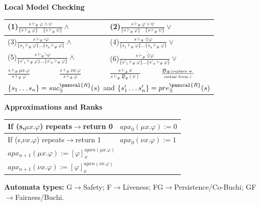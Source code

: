 \documentclass{article}
\newcommand{\Rb}{\pazocal{R}}
\newcommand{\Db}{\mathfrak{D}}
\begin{document}
\begin{multicols}{4}
\textbf{Local Model Checking}
\begin{tabular}{|l|l|l|l|}
\hline
\multicolumn{2}{|l|}{\tiny(1)\small$\frac{s \vdash_{\Phi} \varphi \wedge \psi}{\{s \vdash_{\Phi} \varphi \} \quad \{s \vdash_{\Phi} \psi\}} \wedge$} & \multicolumn{2}{|l|}{\tiny(2)\small$\frac{s \vdash_{\Phi} \varphi \vee \psi}{\{s \vdash_{\Phi} \varphi \} \quad \{s \vdash_{\Phi} \psi\}} \vee $}\\ \hline
\multicolumn{2}{|l|}{\tiny(3)\small$\frac{s \vdash_{\Phi} \square \varphi}{\{s_1 \vdash_{\Phi} \varphi\} \dots \{s_n \vdash_{\Phi} \varphi\}} \wedge$}&\multicolumn{2}{|l|}{\tiny(4)\small$\frac{s \vdash_{\Phi} \diamondsuit \varphi}{\{s_1 \vdash_{\Phi} \varphi\} \dots \{s_n \vdash_{\Phi} \varphi\}} \vee$} \\
 \hline
\multicolumn{2}{|l|}{\tiny(5)\small$\frac{s \vdash_{\Phi} \overleftarrow{\square} \varphi}{\{s'_1 \vdash_{\Phi} \varphi \}\dots \{ s'_n \vdash_{\Phi} \varphi\}} \wedge$} &\multicolumn{2}{|l|}{\tiny(6)\small$\frac{s \vdash_{\Phi} \overleftarrow{\diamondsuit} \varphi}{\{s'_1 \vdash_{\Phi} \varphi \}\dots \{ s'_n \vdash_{\Phi} \varphi\}} \vee$} \\
 \hline
$\frac{s \vdash_{\Phi} \mu x.\varphi}{s \vdash_{\Phi} \varphi}$ &$\frac{s \vdash_{\Phi} \nu x.\varphi}{s \vdash_{\Phi} \varphi}$&$\frac{s \vdash_{\Phi} x}{s \vdash_{\Phi} \Db_{\Phi}(x)}$&$\frac{\Db_{\Phi}\text{\tiny (replace w.}}{\text{\tiny initial form.)}}$\\
 \hline
\multicolumn{4}{|l|}{$\{s_1 \dots s_n \}=suc^{\Rb}_{\exists}({s})$ and $\{s'_1 \dots s'_n \}=pre^{\Rb}_{\exists}({s})$}\\ \hline 
\end{tabular}
\textbf{Approximations and Ranks}
\begin{tabular}{|l|l|}
\hline
If (s,$\mu x.\varphi$) repeats$\rightarrow$return 0&$apx_0(\mu x.\varphi):=0$\\ \hline
If (s,$\nu x.\varphi$) repeats$\rightarrow$return 1& $apx_0(\nu x.\varphi):=1$\\ \hline
\multicolumn{2}{|l|}{$apx_{n+1}(\mu x.\varphi):=[\varphi]_{x}^{apx{n}(\mu x.\varphi)}$}\\ \hline
\multicolumn{2}{|l|}{$apx_{n+1}(\nu x.\varphi):=[\varphi]_{x}^{apx{n}(\nu x.\varphi)}$}\\ \hline
\end{tabular}
\textbf{Automata types:} G$\rightarrow$Safety; F$\rightarrow$Liveness; FG$\rightarrow$Persistence/Co-Buchi; GF$\rightarrow$Fairness/Buchi.


\end{multicols}
\end{document}
